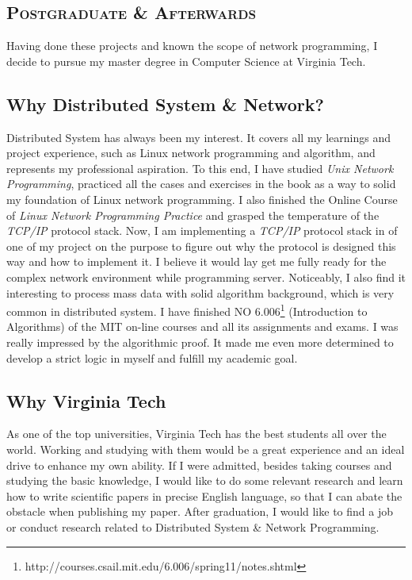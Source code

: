 \documentclass{article}
\begin{document}
\begin{multicols}{2}
		\section{\textsc{Postgraduate \& Afterwards}}
		Having done these projects and known the scope of network programming, I decide to pursue my master degree in Computer Science at Virginia Tech.
		\subsection{Why Distributed System \& Network?}
		Distributed System has always been my interest. It covers all my learnings and project experience, such as Linux network programming and algorithm, and represents my professional aspiration. To this end, I have studied \textit{Unix Network Programming}, practiced all the cases and exercises in the book as a way to solid my foundation of Linux network programming. I also finished the Online Course of \textit{Linux Network Programming Practice} and grasped the temperature of the \textit{TCP/IP} protocol stack. Now, I am implementing a \textit{TCP/IP} protocol stack in of one of my project on the purpose to figure out why the protocol is designed this way and how to implement it. I believe it would lay get me fully ready for the complex network environment while programming server.
		Noticeably, I also find it interesting to process mass data with solid algorithm background, which is very common in distributed system. I have finished NO 6.006\footnote{http://courses.csail.mit.edu/6.006/spring11/notes.shtml} (Introduction to Algorithms) of the MIT on-line courses and all its assignments and exams. I was really impressed by the algorithmic proof. It made me even more determined to develop a strict logic in myself and fulfill my academic goal.
		\subsection{Why Virginia Tech}
		As one of the top universities, Virginia Tech has the best students all over the world. Working and studying with them would be a great experience and an ideal drive to enhance my own ability.
		If I were admitted, besides taking courses and studying the basic knowledge, I would like to do some relevant research and learn how to write scientific papers in precise English language, so that I can abate the obstacle when publishing my paper.
		After graduation, I would like to find a job or conduct research related to Distributed System \& Network Programming.
	\end{multicols}
\end{document}
